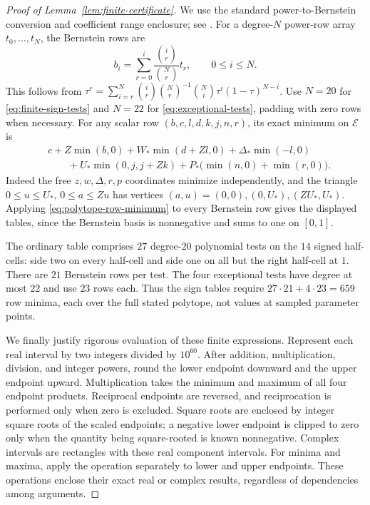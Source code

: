 \documentclass[11pt]{article}
\theoremstyle{remark}\newtheorem{remark}[theorem]{Remark}
\begin{document}
\begin{proof}[Proof of Lemma~\ref{lem:finite-certificate}]
We use the standard power-to-Bernstein conversion and coefficient range
enclosure; see \cite[Section~3, equations~(9)--(10)]{TitiGarloff2019}.
For a degree-$N$ power-row array $t_0,\ldots,t_N$, the Bernstein rows are
\begin{equation}
 b_i=\sum_{r=0}^i\frac{\binom{i}{r}}{\binom{N}{r}}t_r,
 \qquad0\leq i\leq N.
 \label{eq:bernstein-row-conversion}
\end{equation}
This follows from
$\tau^r=\sum_{i=r}^N\binom{i}{r}\binom{N}{r}^{-1}
\binom Ni\tau^i(1-\tau)^{N-i}$.
Use $N=20$ for \eqref{eq:finite-sign-tests} and $N=22$ for
\eqref{eq:exceptional-tests}, padding with zero rows when necessary.
For any scalar row $(b,c,l,d,k,j,n,r)$, its exact minimum on
$\mathcal E$ is
\begin{equation}
\begin{aligned}
 &c+Z\min(b,0)+W_*\min(d+Zl,0)+\Delta_*\min(-l,0)\\
 &\qquad+U_*\min(0,j,j+Zk)
 +P_*\bigl(\min(n,0)+\min(r,0)\bigr).
\end{aligned}
 \label{eq:polytope-row-minimum}
\end{equation}
Indeed the free $z,w,\Delta,r,p$ coordinates minimize independently,
and the triangle $0\leq u\leq U_*$, $0\leq a\leq Zu$ has vertices
$(a,u)=(0,0),(0,U_*),(ZU_*,U_*)$. Applying
\eqref{eq:polytope-row-minimum} to every Bernstein row gives the
displayed tables, since the Bernstein basis is nonnegative and sums
to one on $[0,1]$.

The ordinary table comprises $27$ degree-$20$ polynomial tests on the
$14$ signed half-cells: side two on every half-cell and side one on all
but the right half-cell at $1$. There are $21$ Bernstein rows per test.
The four exceptional tests have degree at most $22$ and use $23$ rows
each. Thus the sign tables require $27\cdot21+4\cdot23=659$ row minima,
each over the full stated polytope, not values at sampled parameter points.

We finally justify rigorous evaluation of these finite expressions.
Represent each real interval by two integers divided by $10^{60}$.
After addition, multiplication, division, and integer powers, round the
lower endpoint downward and the upper endpoint upward. Multiplication
takes the minimum and maximum of all four endpoint products.
Reciprocal endpoints are reversed, and reciprocation is performed only
when zero is excluded. Square roots are enclosed by integer square roots
of the scaled endpoints; a negative lower endpoint is clipped to zero
only when the quantity being square-rooted is known nonnegative.
Complex intervals are rectangles with these real component intervals.
For minima and maxima, apply the operation separately to lower and
upper endpoints. These operations enclose their exact real or complex
results, regardless of dependencies among arguments.


\end{proof}
\end{document}
